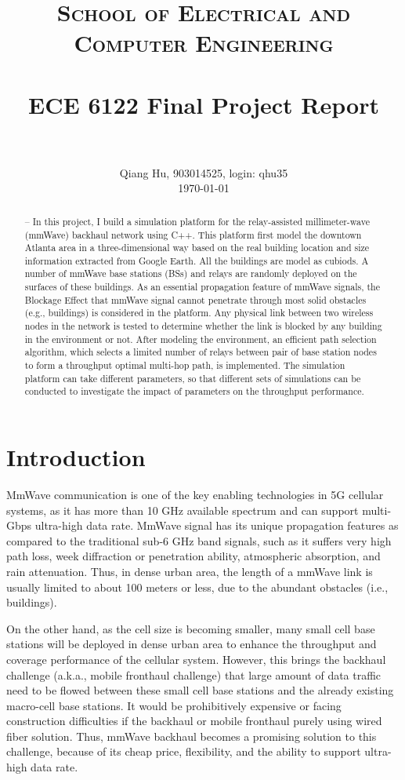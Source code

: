 \documentclass[paper=a4, fontsize=11pt]{scrartcl}
\title{
		\usefont{OT1}{bch}{b}{n}
		\normalfont \normalsize \textsc{School of Electrical and Computer Engineering} \\ [25pt]
		\horrule{0.5pt} \\[0.4cm]
		\huge ECE 6122 Final Project Report \\
		\horrule{2pt} \\[0.5cm]
}
\author{
		\normalfont 								\normalsize
        Qiang Hu, 903014525, login: qhu35\\[-3pt]		\normalsize
        \today
}
\date{}
\numberwithin{equation}{section}		%
\numberwithin{figure}{section}			%
\numberwithin{table}{section}				%
\begin{document}
\maketitle
\begin{abstract}
\abstractname{--}
In this project, I build a simulation platform for the relay-assisted millimeter-wave (mmWave) backhaul network using C++. This platform first model the downtown Atlanta area in a three-dimensional way based on the real building location and size information extracted from Google Earth. All the buildings are model as cubiods. A number of mmWave base stations (BSs) and relays are randomly deployed on the surfaces of these buildings. As an essential propagation feature of mmWave signals, the Blockage Effect that mmWave signal cannot penetrate through most solid obstacles (e.g., buildings) is considered in the platform. Any physical link between two wireless nodes in the network is tested to determine whether the link is blocked by any building in the environment or not. After modeling the environment, an efficient path selection algorithm, which selects a limited number of relays between pair of base station nodes to form a throughput optimal multi-hop path, is implemented. The simulation platform can take different parameters, so that different sets of simulations can be conducted to investigate the impact of parameters on the throughput performance.
\end{abstract}

\section{Introduction}
MmWave communication is one of the key enabling technologies in 5G cellular systems, as it has more than 10 GHz available spectrum and can support multi-Gbps ultra-high data rate. MmWave signal has its unique propagation features as compared to the traditional sub-6 GHz band signals, such as it suffers very high path loss, week diffraction or penetration ability, atmospheric absorption, and rain attenuation. Thus, in dense urban area, the length of a mmWave link is usually limited to about 100 meters or less, due to the abundant obstacles (i.e., buildings). 

On the other hand, as the cell size is becoming smaller, many small cell base stations will be deployed in dense urban area to enhance the throughput and coverage performance of the cellular system. However, this brings the backhaul challenge (a.k.a., mobile fronthaul challenge) that large amount of data traffic need to be flowed between these small cell base stations and the already existing macro-cell base stations. It would be prohibitively expensive or facing construction difficulties if the backhaul or mobile fronthaul purely using wired fiber solution. Thus, mmWave backhaul becomes a promising solution to this challenge, because of its cheap price, flexibility, and the ability to support ultra-high data rate.
\end{document}

